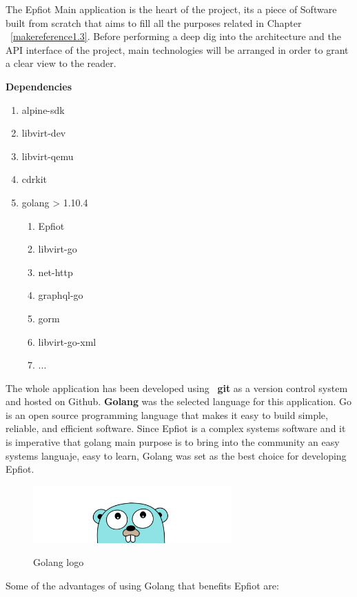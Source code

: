 The Epfiot Main application is the heart of the project, its a piece of Software built from scratch that aims to fill all the purposes related in Chapter ~\ref{makereference1.3}. Before performing a deep dig into the architecture and the API interface of the project, main technologies will be arranged in order to grant a clear view to the reader.

\textbf{Dependencies}

\begin{enumerate}    
  \item alpine-sdk
  \item libvirt-dev
  \item libvirt-qemu
  \item cdrkit
  \item golang > 1.10.4
  \begin{enumerate}
    \item Epfiot
    \item libvirt-go
    \item net-http
    \item graphql-go
    \item gorm
    \item libvirt-go-xml
    \item ...
  \end{enumerate}

\end{enumerate}
The whole application has been developed using ~\textbf{git} as a version control system and hosted on Github. 
\textbf{Golang} was the selected language for this application. Go is an open source programming language that makes it easy to build simple, reliable, and efficient software.
Since Epfiot is a complex systems software and it is imperative that golang main purpose is to bring into the community an easy systems languaje, easy to learn, Golang was set as the best choice for developing Epfiot.

\begin{figure}[h!]%
\centering
    \includegraphics[width=3.0in]{figures/golang.png}
~\caption{Golang logo \cite{golang}}
\label{figure3.4}
\end{figure}

\newpage
Some of the advantages of using Golang that benefits Epfiot are:

